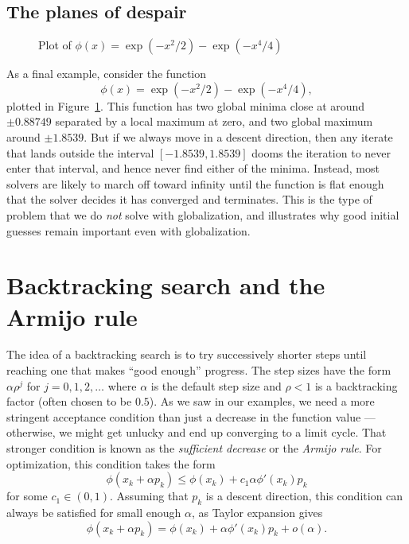 \documentclass[12pt, leqno]{article} %
\begin{document}
\subsection{The planes of despair}

\begin{figure}
\caption{Plot of $\phi(x) = \exp(-x^2/2)-\exp(-x^4/4)$}
\label{fig:doublepass}
\end{figure}

As a final example, consider the function
\[
  \phi(x) = \exp(-x^2/2)-\exp(-x^4/4),
\]
plotted in Figure~\ref{fig:doublepass}.
This function has two global minima close at around $\pm 0.88749$
separated by a local maximum at zero, and two global maximum around
$\pm 1.8539$.  But if we always move in a descent direction, then any
iterate that lands outside the interval $[-1.8539, 1.8539]$ dooms the
iteration to never enter that interval, and hence never find either of
the minima.  Instead, most solvers are likely to march off toward
infinity until the function is flat enough that the solver decides it
has converged and terminates.  This is the type of problem that we do
{\em not} solve with globalization, and illustrates why good
initial guesses remain important even with globalization.

\section{Backtracking search and the Armijo rule}

The idea of a backtracking search is to try successively
shorter steps until reaching one that makes ``good enough''
progress.  The step sizes have the form
$\alpha \rho^j$ for $j = 0, 1, 2, \ldots$ where $\alpha$ is the
default step size and $\rho < 1$ is a backtracking factor (often
chosen to be $0.5$).  As we saw in our examples, we need a more
stringent acceptance condition than just a decrease in the function
value --- otherwise, we might get unlucky and end up converging to
a limit cycle.  That stronger condition is known as the
{\em sufficient decrease} or the {\em Armijo rule}.  For optimization,
this condition takes the form
\[
  \phi(x_k + \alpha p_k) \leq \phi(x_k) + c_1 \alpha \phi'(x_k) p_k
\]
for some $c_1 \in (0,1)$.  Assuming that $p_k$ is a descent direction,
this condition can always be satisfied for small enough $\alpha$,
as Taylor expansion gives
\[
  \phi(x_k + \alpha p_k) = \phi(x_k) + \alpha \phi'(x_k) p_k + o(\alpha).
\]
\end{document}
